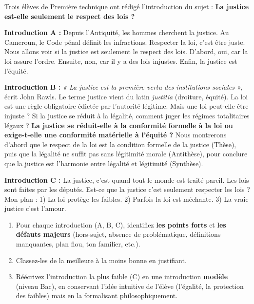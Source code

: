 \documentclass[11pt]{article}
\begin{document}
\begin{exercice}
Trois élèves de Première technique ont rédigé l'introduction du sujet : \og \textbf{La justice est-elle seulement le respect des lois ?} \fg{}

\textbf{Introduction A :}
\og Depuis l'Antiquité, les hommes cherchent la justice. Au Cameroun, le Code pénal définit les infractions. Respecter la loi, c'est être juste. Nous allons voir si la justice est seulement le respect des lois. D'abord, oui, car la loi assure l'ordre. Ensuite, non, car il y a des lois injustes. Enfin, la justice est l'équité. \fg{}

\textbf{Introduction B :}
\og \emph{« La justice est la première vertu des institutions sociales »,} écrit John Rawls. Le terme \og justice \fg{} vient du latin \emph{justitia} (droiture, équité). La \og loi \fg{} est une règle obligatoire édictée par l'autorité légitime. Mais une loi peut-elle être injuste ? Si la justice se réduit à la légalité, comment juger les régimes totalitaires légaux ? \textbf{La justice se réduit-elle à la conformité formelle à la loi ou exige-t-elle une conformité matérielle à l'équité ?} Nous montrerons d'abord que le respect de la loi est la condition formelle de la justice (Thèse), puis que la légalité ne suffit pas sans légitimité morale (Antithèse), pour conclure que la justice est l'harmonie entre légalité et légitimité (Synthèse). \fg{}

\textbf{Introduction C :}
\og La justice, c'est quand tout le monde est traité pareil. Les lois sont faites par les députés. Est-ce que la justice c'est seulement respecter les lois ? Mon plan : 1) La loi protège les faibles. 2) Parfois la loi est méchante. 3) La vraie justice c'est l'amour. \fg{}

\begin{enumerate}
\item Pour chaque introduction (A, B, C), identifiez \textbf{les points forts} et \textbf{les défauts majeurs} (hors-sujet, absence de problématique, définitions manquantes, plan flou, ton familier, etc.).
\item Classez-les de la meilleure à la moins bonne en justifiant.
\item Réécrivez l'introduction la plus faible (C) en une introduction \textbf{modèle} (niveau Bac), en conservant l'idée intuitive de l'élève (l'égalité, la protection des faibles) mais en la formalisant philosophiquement.
\end{enumerate}
\end{exercice}
\end{document}
